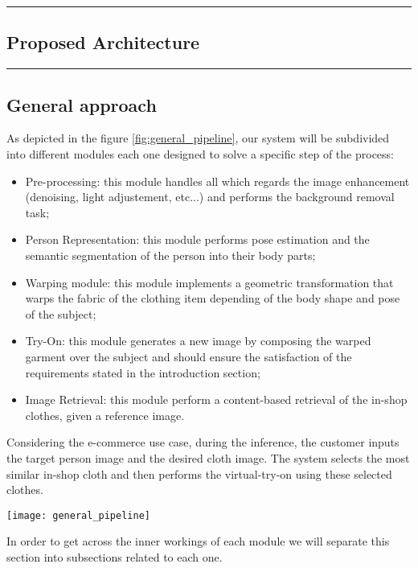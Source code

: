 {\color{gray}\hrule}
\begin{center}
\section{Proposed Architecture}
\end{center}
{\color{gray}\hrule}


\subsection{General approach}

As depicted in the figure \ref{fig:general_pipeline}, our system will be subdivided into different modules each one designed to solve a specific step of the process:
\begin{itemize}[noitemsep]
\item Pre-processing: this module handles all which regards the image enhancement (denoising, light adjustement, etc...) and performs the background removal task;
\item Person Representation: this module performs pose estimation and the semantic segmentation of the person into their body parts;
\item Warping module: this module implements a geometric transformation that warps the fabric of the clothing item depending of the body shape and pose of the subject;
\item Try-On: this module generates a new image by composing the warped garment over the subject and should ensure the satisfaction of the requirements stated in the introduction section;
\item Image Retrieval: this module perform a content-based retrieval of the in-shop clothes, given a reference image.
\end{itemize}

Considering the e-commerce use case, during the inference, the customer inputs the target person image and the desired cloth image. The system selects the most similar in-shop cloth and then performs the virtual-try-on using these selected clothes.

\begin{figure*}[h]
\centering
\texttt{[image: general\_pipeline]}
\caption{Overview of the pipeline}
\label{fig:general_pipeline}
\end{figure*}



In order to get across the inner workings of each module we will separate this section into subsections related to each one.


